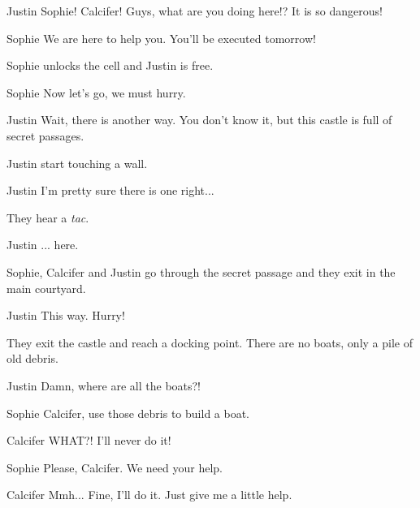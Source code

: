 \begin{screenplay}

\begin{dialogue}{Justin}
Sophie! Calcifer! Guys, what are you doing here!? It is so dangerous!
\end{dialogue}

\begin{dialogue}{Sophie}
We are here to help you. You'll be executed tomorrow!
\end{dialogue}

Sophie unlocks the cell and Justin is free.

\begin{dialogue}{Sophie}
Now let's go, we must hurry.
\end{dialogue}

\begin{dialogue}{Justin}
Wait, there is another way. You don't know it, but this castle is full of secret passages.
\end{dialogue}

Justin start touching a wall.

\begin{dialogue}[continuing]{Justin}
I'm pretty sure there is one right...
\end{dialogue}

They hear a \textit{tac}.

\begin{dialogue}[continuing]{Justin}
... here.
\end{dialogue}

Sophie, Calcifer and Justin go through the secret passage and they exit in the main courtyard.

\begin{dialogue}{Justin}
This way. Hurry! 
\end{dialogue}

They exit the castle and reach a docking point. There are no boats, only a pile of old debris.

\begin{dialogue}[worried]{Justin}
Damn, where are all the boats?!
\end{dialogue}

\begin{dialogue}{Sophie}
Calcifer, use those debris to build a boat.
\end{dialogue}

\begin{dialogue}[scared]{Calcifer}
WHAT?! I'll never do it!
\end{dialogue}

\begin{dialogue}{Sophie}
Please, Calcifer. We need your help.
\end{dialogue}

\begin{dialogue}{Calcifer}
Mmh... Fine, I'll do it. Just give me a little help.
\end{dialogue}

\end{screenplay}
\vspace{1em}


